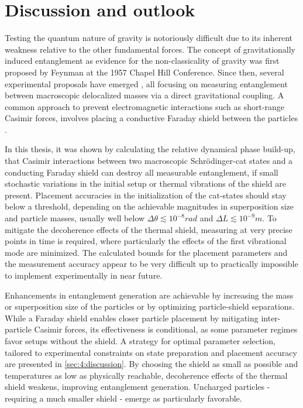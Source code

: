 \chapter{Discussion and outlook}\label{cha:discussion-outlook}
Testing the quantum nature of gravity is notoriously difficult due to its inherent weakness relative to the other fundamental forces.
The concept of gravitationally induced entanglement as evidence for the non-classicality of gravity was first proposed by Feynman at the 1957 Chapel Hill Conference.
Since then, several experimental proposals have emerged \cite{Bose_2017,Marletto_2017, Krisnanda_2020}, all focusing on measuring entanglement between macroscopic delocalized masses via a direct gravitational coupling.
A common approach to prevent electromagnetic interactions such as short-range Casimir forces, involves placing a conductive Faraday shield between the particles \cite{Kamp_2020}.

In this thesis, it was shown by calculating the relative dynamical phase build-up, that Casimir interactions between two macroscopic Schrödinger-cat states and a conducting Faraday shield can destroy all measurable entanglement, if small stochastic variations in the initial setup or thermal vibrations of the shield are present.
Placement accuracies in the initialization of the cat-states should stay below a threshold, depending on the achievable magnitudes in superposition size and particle masses, usually well below $\Delta \theta \lesssim 10^{-8}\si{rad}$ and $\Delta L \lesssim 10^{-9}\si{m}$.
To mitigate the decoherence effects of the thermal shield, measuring at very precise points in time is required, where particularly the effects of the first vibrational mode are minimized.
The calculated bounds for the placement parameters and the measurement accuracy appear to be very difficult up to practically impossible to implement experimentally in near future.

Enhancements in entanglement generation are achievable by increasing the mass or superposition size of the particles or by optimizing particle-shield separations.
While a Faraday shield enables closer particle placement by mitigating inter-particle Casimir forces, its effectiveness is conditional, as some parameter regimes favor setups without the shield.
A strategy for optimal parameter selection, tailored to experimental constraints on state preparation and placement accuracy are presented in \cref{sec:4:discussion}.
By choosing the shield as small as possible and temperatures as low as physically reachable, decoherence effects of the thermal shield weakens, improving entanglement generation.
Uncharged particles - requiring a much smaller shield - emerge as particularly favorable.

